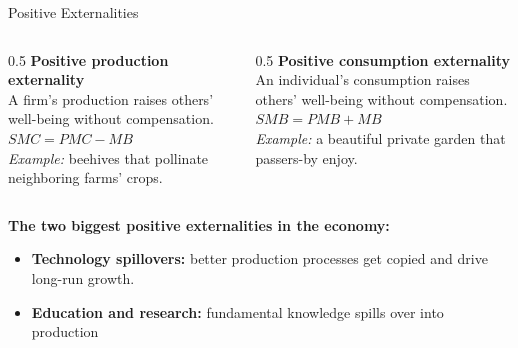 \documentclass[11pt,aspectratio=169]{beamer}
\begin{document}
\begin{frame}{Positive Externalities}
  \begin{columns}[T]
    \begin{column}{0.5\textwidth}
      \textbf{Positive production externality}\\
      \small A firm's production raises others' well-being without compensation.\\
      $SMC = PMC - MB$\\[0.4em]
      \emph{Example:} beehives that pollinate neighboring farms' crops.
    \end{column}
    \begin{column}{0.5\textwidth}
      \textbf{Positive consumption externality}\\
      \small An individual's consumption raises others' well-being without compensation.\\
      $SMB = PMB + MB$\\[0.4em]
      \emph{Example:} a beautiful private garden that passers-by enjoy.
    \end{column}
  \end{columns}
  \vspace{0.8em}
  \textbf{The two biggest positive externalities in the economy:}
  \begin{itemize}
    \item \textbf{Technology spillovers:} better production processes get copied and drive long-run growth.
    \item \textbf{Education and research:} fundamental knowledge spills over into production  
  \end{itemize}
\end{frame}
\end{document}
